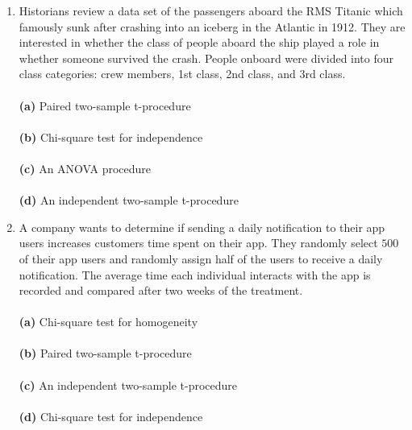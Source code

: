 \documentclass[12pt]{article}
\begin{document}
\begin{enumerate}[leftmargin=\labelsep]
\item  Historians review a data set of the passengers aboard the RMS Titanic which famously sunk after crashing into an iceberg in the Atlantic in 1912. They are interested in whether the class of people aboard the ship played a role in whether someone survived the crash. People onboard were divided into four class categories: crew members, 1st class, 2nd class, and 3rd class.\\ \vspace{1mm}\\
{\bf (a)} \hspace{2mm} Paired two-sample t-procedure\\ \vspace{1mm}\\
{\bf (b)} \hspace{2mm} Chi-square test for independence\\   \vspace{1mm}\\
{\bf (c)} \hspace{2mm} An ANOVA procedure\\  \vspace{1mm}\\
{\bf (d)} \hspace{2mm} An independent two-sample t-procedure\\

\item A company wants to determine if sending a daily notification to their app users increases customers time spent on their app. They randomly select $500$ of their app users and randomly assign half of the users to receive a daily notification. The average time each individual interacts with the app is recorded and compared after two weeks of the treatment.\\
\vspace{1mm}\\
{\bf (a)} \hspace{2mm} Chi-square test for homogeneity\\ \vspace{1mm}\\
{\bf (b)} \hspace{2mm} Paired two-sample t-procedure\\   \vspace{1mm}\\
{\bf (c)} \hspace{2mm} An independent two-sample t-procedure\\ \vspace{1mm}\\  
{\bf (d)} \hspace{2mm} Chi-square test for independence\\


\end{enumerate}
\end{document}
